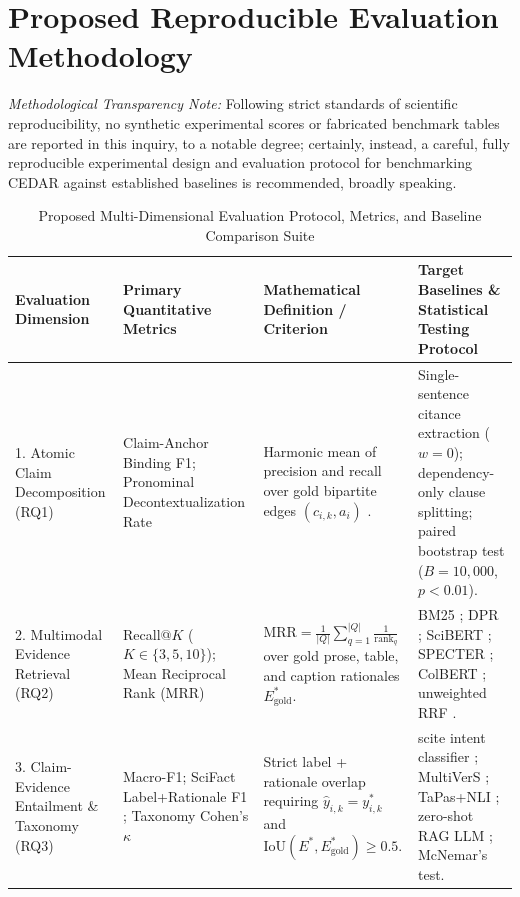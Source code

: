 \documentclass[sigconf]{acmart}
\begin{document}
\section{Proposed Reproducible Evaluation Methodology}
\label{sec:evaluation}

\emph{Methodological Transparency Note:} Following strict standards of scientific reproducibility, no synthetic experimental scores or fabricated benchmark tables are reported in this inquiry, to a notable degree; certainly, instead, a careful, fully reproducible experimental design and evaluation protocol for benchmarking CEDAR against established baselines is recommended, broadly speaking.

\begin{table}[t]
\centering
\footnotesize
\caption{Proposed Multi-Dimensional Evaluation Protocol, Metrics, and Baseline Comparison Suite}
\label{tab:evaluation_metrics}
\renewcommand{\arraystretch}{1.14}
\begin{tabularx}{\textwidth}{L{2.7cm} L{3.3cm} L{4.2cm} Y}
\toprule
\textbf{Evaluation Dimension} & \textbf{Primary Quantitative Metrics} & \textbf{Mathematical Definition / Criterion} & \textbf{Target Baselines \& Statistical Testing Protocol} \\
. Atomic Claim Decomposition (RQ1) & Claim-Anchor Binding F1; Pronominal Decontextualization Rate & Harmonic mean of precision and recall over gold bipartite edges $(c_{i,k}, a_i)$ \cite{kamoi2023wice,min2023factscore}. & Single-sentence citance extraction ($w=0$); dependency-only clause splitting; paired bootstrap test ($B=10{,}000$, $p < 0.01$). \\
2. Multimodal Evidence Retrieval (RQ2) & Recall@$K$ ($K \in \{3, 5, 10\}$); Mean Reciprocal Rank (MRR) & $\text{MRR} = \frac{1}{|Q|}\sum_{q=1}^{|Q|} \frac{1}{\text{rank}_q}$ over gold prose, table, and caption rationales $E_{\text{gold}}^*$. & BM25 \cite{robertson2009probabilistic}; DPR \cite{karpukhin2020dense}; SciBERT \cite{beltagy2019scibert}; SPECTER \cite{cohan2020specter}; ColBERT \cite{khattab2020colbert}; unweighted RRF \cite{cormack2009reciprocal}. \\
3. Claim-Evidence Entailment \& Taxonomy (RQ3) & Macro-F1; SciFact Label+Rationale F1 \cite{wadden2020fact}; Taxonomy Cohen's $\kappa$ & Strict label + rationale overlap requiring $\hat{y}_{i,k} = y^*_{i,k}$ and $\text{IoU}(E^*, E_{\text{gold}}^*) \geq 0.5$. & scite intent classifier \cite{nicholson2021scite}; MultiVerS \cite{wadden2022multivers}; TaPas+NLI \cite{herzig2020tapas,lu2023scitab}; zero-shot RAG LLM \cite{gao2023enabling}; McNemar's test. \\

\end{tabularx}
\end{table}
\end{document}
